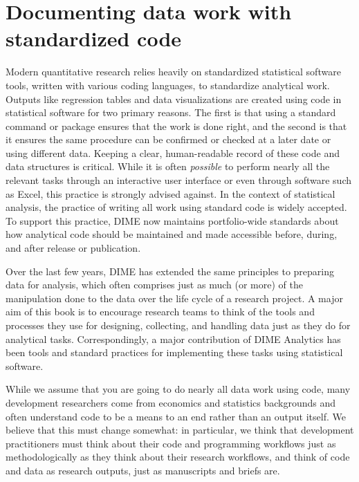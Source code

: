 \section{Documenting data work with standardized code}

Modern quantitative research relies heavily
on standardized statistical software tools,
written with various coding languages, to standardize analytical work.
Outputs like regression tables and data visualizations
are created using code in statistical software for two primary reasons.
The first is that using a standard command or package ensures that the work is done right,
and the second is that it ensures the same procedure can be confirmed or checked
at a later date or using different data.
Keeping a clear, human-readable record of these code and data structures is critical.
While it is often \textit{possible} to perform nearly all the relevant tasks
through an interactive user interface or even through software such as Excel,
this practice is strongly advised against.
In the context of statistical analysis,
the practice of writing all work using standard code is widely accepted.
To support this practice, DIME now maintains portfolio-wide standards
about how analytical code should be maintained and made accessible
before, during, and after release or publication.

Over the last few years, DIME has extended the same principles to preparing data for analysis,
which often comprises just as much (or more) of the manipulation done to the data
over the life cycle of a research project.
A major aim of this book is to encourage research teams
to think of the tools and processes they use
for designing, collecting, and handling data
just as they do for analytical tasks.
Correspondingly, a major contribution of DIME Analytics
has been tools and standard practices
for implementing these tasks using statistical software.

While we assume that you are going to do nearly all data work using code,
many development researchers come from economics and statistics backgrounds
and often understand code to be a means to an end rather than an output itself.
We believe that this must change somewhat:
in particular, we think that development practitioners
must think about their code and programming workflows
just as methodologically as they think about their research workflows,
and think of code and data as research outputs, just as manuscripts and briefs are.

